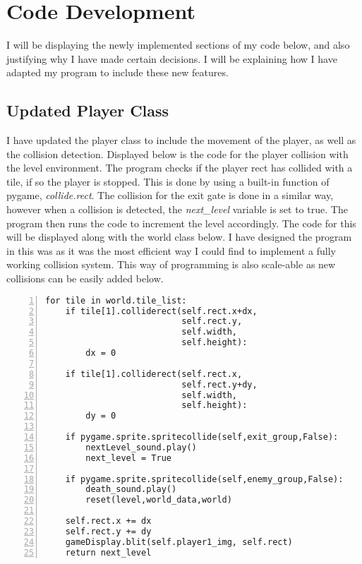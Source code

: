 \documentclass[12pt]{report}
\begin{document}
\pagebreak

\section{Code Development}
I will be displaying the newly implemented sections of my code below, and also justifying why I have made certain decisions. I will be explaining how I have adapted my program to include these new features. 

\subsection{Updated Player Class}
I have updated the player class to include the movement of the player, as well as the collision detection. Displayed below is the code for the player collision with the level environment. The program checks if the player rect has collided with a tile, if so the player is stopped. This is done by using a built-in function of pygame, \textit{collide.rect}. The collision for the exit gate is done in a similar way, however when a collision is detected, the \textit{next\_level} variable is set to true. The program then runs the code to increment the level accordingly. The code for this will be displayed along with the world class below. I have designed the program in this was as it was the most efficient way I could find to implement a fully working collision system. This way of programming is also scale-able as new collisions can be easily added below.

\begin{Verbatim}[numbers=left, frame=single]
for tile in world.tile_list:
    if tile[1].colliderect(self.rect.x+dx,
                           self.rect.y,
                           self.width,
                           self.height):
        dx = 0

    if tile[1].colliderect(self.rect.x,
                           self.rect.y+dy,
                           self.width,
                           self.height):
        dy = 0

    if pygame.sprite.spritecollide(self,exit_group,False):
        nextLevel_sound.play()
        next_level = True

    if pygame.sprite.spritecollide(self,enemy_group,False):
        death_sound.play()
        reset(level,world_data,world)

    self.rect.x += dx
    self.rect.y += dy
    gameDisplay.blit(self.player1_img, self.rect)
    return next_level
\end{Verbatim}
\end{document}
